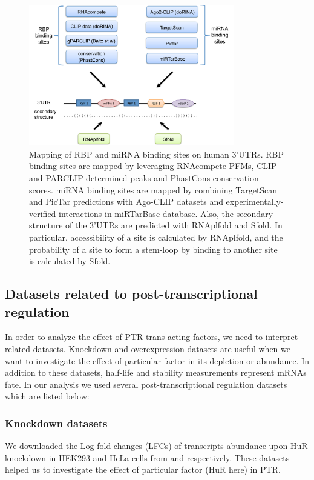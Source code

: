\begin{figure}[ht!]
   \centering
   \includegraphics[width=0.8\textwidth,clip]{ch3_materials_methods/figures/Figure1.pdf}

\caption[]{Mapping of RBP and miRNA binding sites on human 3'UTRs. RBP binding sites are mapped by leveraging RNAcompete PFMs, CLIP- and PARCLIP-determined peaks and PhastCons conservation scores. miRNA binding sites are mapped by combining TargetScan and PicTar predictions with Ago-CLIP datasets and experimentally-verified interactions in miRTarBase database. Also, the secondary structure of the 3'UTRs are predicted with RNAplfold and Sfold. In particular, accessibility of a site is calculated by RNAplfold, and the probability of a site to form a stem-loop by binding to another site is calculated by Sfold.}
\label{overview}
\end{figure}


\subsection{Datasets related to post-transcriptional regulation}

In order to analyze the effect of PTR trans-acting factors, we need to interpret related datasets. Knockdown and overexpression datasets are useful when we want to investigate the effect of particular factor in its depletion or abundance. In addition to these datasets, half-life and stability measurements represent mRNAs fate. In our analysis we used several post-transcriptional regulation datasets which are listed below:

\subsubsection{Knockdown datasets} We downloaded the Log fold changes (LFCs) of transcripts abundance upon HuR knockdown in HEK293 and HeLa cells from \cite{mukharjee_11} and \cite{lebedeva_11} respectively. These datasets helped us to investigate the effect of particular factor (HuR here) in PTR.

